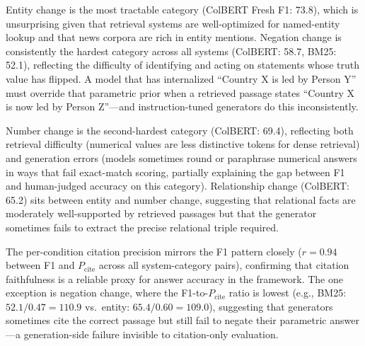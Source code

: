 Entity change is the most tractable category (ColBERT Fresh F1: 73.8), which is unsurprising given that retrieval systems are well-optimized for named-entity lookup and that news corpora are rich in entity mentions. Negation change is consistently the hardest category across all systems (ColBERT: 58.7, BM25: 52.1), reflecting the difficulty of identifying and acting on statements whose truth value has flipped. A model that has internalized ``Country X is led by Person Y'' must override that parametric prior when a retrieved passage states ``Country X is now led by Person Z''---and instruction-tuned generators do this inconsistently.

Number change is the second-hardest category (ColBERT: 69.4), reflecting both retrieval difficulty (numerical values are less distinctive tokens for dense retrieval) and generation errors (models sometimes round or paraphrase numerical answers in ways that fail exact-match scoring, partially explaining the gap between F1 and human-judged accuracy on this category). Relationship change (ColBERT: 65.2) sits between entity and number change, suggesting that relational facts are moderately well-supported by retrieved passages but that the generator sometimes fails to extract the precise relational triple required.

The per-condition citation precision mirrors the F1 pattern closely ($r = 0.94$ between F1 and $P_{\text{cite}}$ across all system-category pairs), confirming that citation faithfulness is a reliable proxy for answer accuracy in the \method{} framework. The one exception is negation change, where the F1-to-$P_{\text{cite}}$ ratio is lowest (e.g., BM25: $52.1 / 0.47 = 110.9$ vs.\ entity: $65.4 / 0.60 = 109.0$), suggesting that generators sometimes cite the correct passage but still fail to negate their parametric answer---a generation-side failure invisible to citation-only evaluation.

